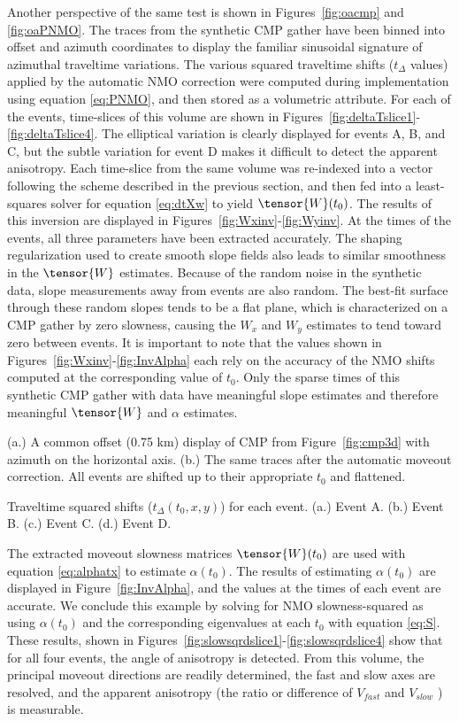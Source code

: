 Another perspective of the same test is shown in Figures~\ref{fig:oacmp} and \ref{fig:oaPNMO}.  The traces from the synthetic CMP gather have been binned into offset and azimuth coordinates to display the familiar sinusoidal signature of azimuthal traveltime variations.  The various squared traveltime shifts ($t_\Delta $ values) applied by the automatic NMO correction were computed during implementation using equation \ref{eq:PNMO}, and then stored as a volumetric attribute.  For each of the events, time-slices of this volume are shown in Figures~\ref{fig:deltaTslice1}-\ref{fig:deltaTslice4}.  The elliptical variation is clearly displayed for events A, B, and C, but the subtle variation for event D makes it difficult to detect the apparent anisotropy. Each time-slice from the same volume was re-indexed into a vector following the scheme described in the previous section, and then fed into a least-squares solver for equation \ref{eq:dtXw} to yield $\tensor{W}(t_0)$.  The results of this inversion are displayed in Figures~\ref{fig:Wxinv}-\ref{fig:Wyinv}. At the times of the events, all three parameters have been extracted accurately.  The shaping regularization used to create smooth slope fields also leads to similar smoothness in the $\tensor{W}$ estimates.  Because of the random noise in the synthetic data, slope measurements away from events are also random.  The best-fit surface through these random slopes tends to be a flat plane, which is characterized on a CMP gather by zero slowness, causing the $W_x$ and $W_y$ estimates to tend toward zero between events.  It is important to note that the values shown in Figures~\ref{fig:Wxinv}-\ref{fig:InvAlpha} each rely on the accuracy of the NMO shifts computed at the corresponding value of $t_0$.  Only the sparse times of this synthetic CMP gather with data have meaningful slope estimates and therefore meaningful $\tensor{W}$ and $\alpha $ estimates.  

 {(a.) A common offset (0.75 km) display of CMP from Figure~\ref{fig:cmp3d} with azimuth on the horizontal axis.  (b.) The same traces after the automatic moveout correction.  All events are shifted up to their appropriate $t_0$ and flattened.}

{Traveltime squared shifts ($t_{\Delta }(t_0,x,y)$) for each event. (a.) Event A. (b.) Event B. (c.) Event C. (d.) Event D.}

The extracted moveout slowness matrices $\tensor{W}(t_0)$ are used with equation \ref{eq:alphatx} to estimate $\alpha (t_0)$.  The results of estimating $\alpha (t_0)$ are displayed in Figure~\ref{fig:InvAlpha}, and the values at the times of each event are accurate.  We conclude this example by solving for NMO slowness-squared as using $\alpha (t_0)$ and the corresponding eigenvalues at each $t_0$ with equation \ref{eq:S}. These results, shown in Figures~\ref{fig:slowsqrdslice1}-\ref{fig:slowsqrdslice4} show that for all four events, the angle of anisotropy is detected.  From this volume, the principal moveout directions are readily determined, the fast and slow axes are resolved, and the apparent anisotropy (the ratio or difference of $V_{fast}$ and $V_{slow}$ ) is measurable.

